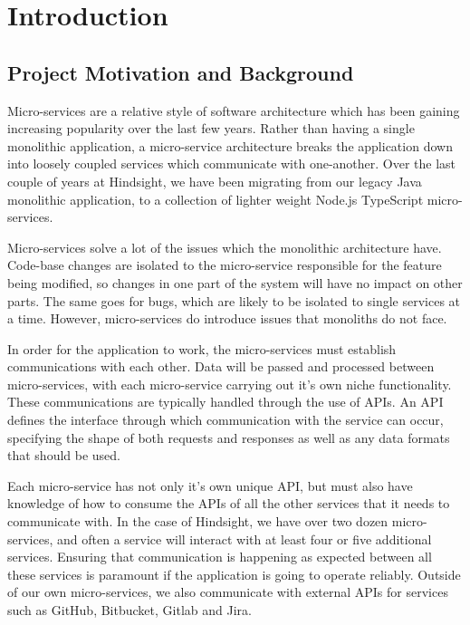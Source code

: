 \chapter{Introduction}
\section{Project Motivation and Background}

Micro-services are a relative style of software architecture which has been gaining increasing popularity over the last few years. Rather than having a single monolithic application, a micro-service architecture breaks the application down into loosely coupled services which communicate with one-another. Over the last couple of years at Hindsight, we have been migrating from our legacy Java monolithic application, to a collection of lighter weight Node.js TypeScript micro-services.

Micro-services solve a lot of the issues which the monolithic architecture have. Code-base changes are isolated to the micro-service responsible for the feature being modified, so changes in one part of the system will have no impact on other parts. The same goes for bugs, which are likely to be isolated to single services at a time. However, micro-services do introduce issues that monoliths do not face.

In order for the application to work, the micro-services must establish communications with each other. Data will be passed and processed between micro-services, with each micro-service carrying out it's own niche functionality. These communications are typically handled through the use of APIs. An API defines the interface through which communication with the service can occur, specifying the shape of both requests and responses as well as any data formats that should be used.

Each micro-service has not only it's own unique API, but must also have knowledge of how to consume the APIs of all the other services that it needs to communicate with. In the case of Hindsight, we have over two dozen micro-services, and often a service will interact with at least four or five additional services. Ensuring that communication is happening as expected between all these services is paramount if the application is going to operate reliably. Outside of our own micro-services, we also communicate with  external APIs for services such as GitHub, Bitbucket, Gitlab and Jira.

